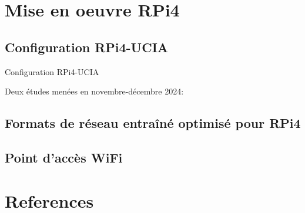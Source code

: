 \documentclass[11pt,serif,mathserif,compress,hyperref={colorlinks}]{beamer}
\begin{document}
\section{Mise en oeuvre RPi4}

\subsection{Configuration RPi4-UCIA}

\begin{frame}{Configuration RPi4-UCIA}
  
  \begin{tcolorbox}[add to width=.7cm, title={Études pour le projet UCIA}]
    Deux études menées en novembre-décembre 2024:
    
  \end{tcolorbox}
    
\end{frame}

\subsection{Formats de réseau entraîné optimisé pour RPi4}

\subsection{Point d'accès WiFi}

\subsection{}

\subsection{}


\section{References}
\end{document}
